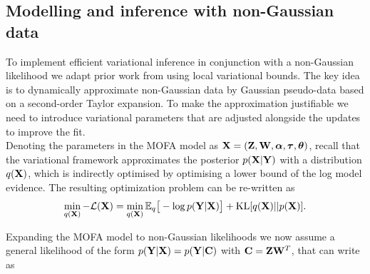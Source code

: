 \subsection{Modelling and inference with non-Gaussian data} \label{section:mofa_ngaussian}
To implement efficient variational inference in conjunction with a non-Gaussian likelihood we adapt prior work from \cite{Seeger2012} using local variational bounds. The key idea is to dynamically approximate non-Gaussian data by Gaussian pseudo-data based on a second-order Taylor expansion.  To make the approximation justifiable we need to introduce variational parameters that are adjusted alongside the updates to improve the fit.	\\
Denoting the parameters in the MOFA model as ${\bf X}= ({\bf Z},{\bf W},\mbox{\boldmath $\alpha$},\mbox{\boldmath $\tau$},\mbox{\boldmath $\theta$})$, recall that the variational framework approximates the posterior $p({\bf X} | {\bf Y} )$ with a distribution $q({\bf X})$, which is indirectly optimised by optimising a lower bound of the log model evidence. The resulting optimization problem can be re-written as
\begin{equation*}
\min_{q({\bf X})} -\mathcal{L}({\bf X}) =  \min_{q({\bf X})} \mathbb{E}_q \big[ -\log p({\bf Y}|{\bf X}) \big] + {\rm KL}[q({\bf X})||p({\bf X})].
\end{equation*}


Expanding the MOFA model to non-Gaussian likelihoods we now assume a general likelihood of the form $p({\bf Y}|{\bf X})=p({\bf Y}|{\bf C})$ with ${\bf C} = {\bf Z}{\bf W}^{T}$, that can write as

